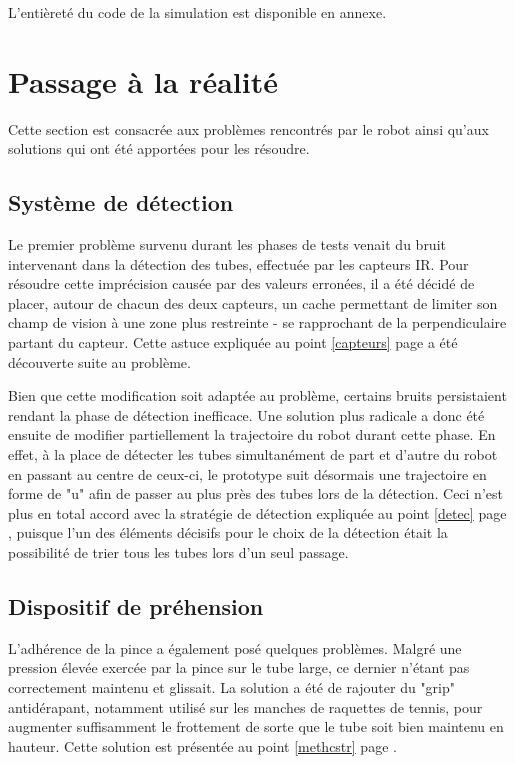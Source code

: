 \documentclass[a4paper,11pt]{article}
\begin{document}
L'entièreté du code de la simulation est disponible en annexe.


\clearpage

\section{\label{sec:4real}Passage à la réalité}

Cette section est consacrée aux problèmes rencontrés par le robot ainsi qu'aux solutions qui ont été apportées pour les résoudre.

\subsection{Système de détection}

Le premier problème survenu durant les phases de tests venait du bruit intervenant dans la détection des tubes, effectuée par les capteurs IR. Pour résoudre cette imprécision causée par des valeurs erronées, il a été décidé de placer, autour de chacun des deux capteurs, un cache permettant de limiter son champ de vision à une zone plus restreinte - se rapprochant de la perpendiculaire partant du capteur. Cette astuce expliquée au point \ref{capteurs} page \pageref{capteurs} a été découverte suite au problème.

Bien que cette modification soit adaptée au problème, certains bruits persistaient rendant la phase de détection inefficace. Une solution plus radicale a donc été ensuite de modifier partiellement la trajectoire du robot durant cette phase. En effet, à la place de détecter les tubes simultanément de part et d'autre du robot en passant au centre de ceux-ci, le prototype suit désormais une trajectoire en forme de "u" afin de passer au plus près des tubes lors de la détection. Ceci n'est plus en total accord avec la stratégie de détection expliquée au point \ref{detec} page \pageref{detec}, puisque l'un des éléments décisifs pour le choix de la détection était la possibilité de trier tous les tubes lors d'un seul passage.

\subsection{Dispositif de préhension}

L'adhérence de la pince a également posé quelques problèmes. Malgré une pression élevée exercée par la pince sur le tube large, ce dernier n'étant pas correctement maintenu et glissait. La solution a été de rajouter du "grip" antidérapant, notamment utilisé sur les manches de raquettes de tennis, pour augmenter suffisamment le frottement de sorte que le tube soit bien maintenu en hauteur. Cette solution est présentée au point \ref{methcstr} page \pageref{methcstr}.
\end{document}
